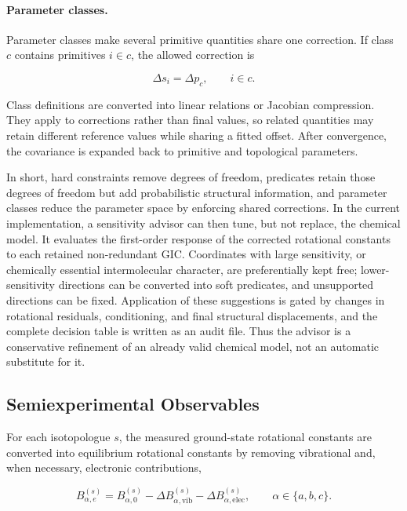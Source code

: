 \documentclass[aip,jcp,reprint,longbibliography,floatfix]{revtex4-2}
\begin{document}
\paragraph{Parameter classes.}

Parameter classes make several primitive quantities share one correction. If
class $c$ contains primitives $i\in c$, the allowed correction is

\begin{equation}
\Delta s_i
=
\Delta p_c,
\qquad
i\in c .
\end{equation}

Class definitions are converted into linear relations or Jacobian compression.
They apply to corrections rather than final values, so related quantities may
retain different reference values while sharing a fitted offset. After
convergence, the covariance is expanded back to primitive and topological
parameters.

In short, hard constraints remove degrees of freedom, predicates retain those
degrees of freedom but add probabilistic structural information, and parameter
classes reduce the parameter space by enforcing shared corrections. In the
current implementation, a sensitivity advisor can then tune, but not replace,
the chemical model. It evaluates the first-order response of the corrected
rotational constants to each retained non-redundant GIC. Coordinates with large
sensitivity, or chemically essential intermolecular character, are
preferentially kept free; lower-sensitivity directions can be converted into
soft predicates, and unsupported directions can be fixed. Application of these
suggestions is gated by changes in rotational residuals, conditioning, and
final structural displacements, and the complete decision table is written as
an audit file. Thus the advisor is a conservative refinement of an already
valid chemical model, not an automatic substitute for it.


\subsection{Semiexperimental Observables}

For each isotopologue $s$, the measured ground-state rotational constants are
converted into equilibrium rotational constants by removing vibrational and,
when necessary, electronic contributions,\cite{Costain1958,Pawlowski2002,Piccardo2015B3LYP,Penocchio2015B2PLYP}

\begin{equation}
B_{\alpha,e}^{(s)}
= B_{\alpha,0}^{(s)}
- \Delta B_{\alpha,\mathrm{vib}}^{(s)}
- \Delta B_{\alpha,\mathrm{elec}}^{(s)},
\qquad
\alpha \in \{a,b,c\}.
\end{equation}
\end{document}

